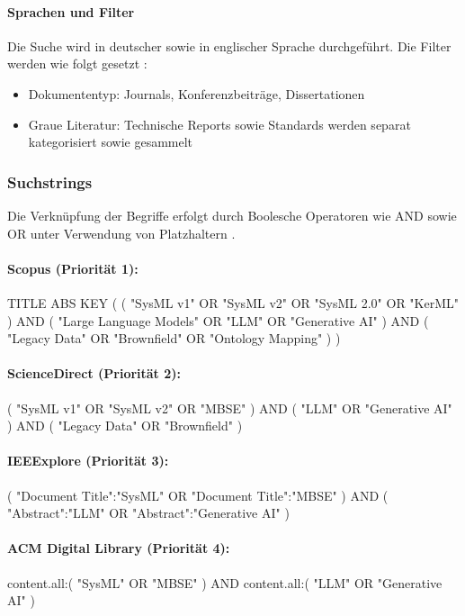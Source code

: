 \paragraph{Sprachen und Filter}

Die Suche wird in deutscher sowie in englischer Sprache durchgeführt. Die Filter werden wie folgt gesetzt \cite{Higgins.2019}:
\begin{itemize}
    \item Dokumententyp: Journals, Konferenzbeiträge, Dissertationen
    \item Graue Literatur: Technische Reports sowie Standards werden separat kategorisiert sowie gesammelt
\end{itemize}

\subsubsection{Suchstrings}
\label{app:lsp_suchstrings}

Die Verknüpfung der Begriffe erfolgt durch Boolesche Operatoren wie AND sowie OR
unter Verwendung von Platzhaltern \cite{Jha.2022}.

\begingroup
{}

\paragraph{Scopus (Priorität 1):}
TITLE ABS KEY ( ( "SysML v1" OR "SysML v2" OR "SysML 2.0" OR "KerML" )
AND ( "Large Language Models" OR "LLM" OR "Generative AI" )
AND ( "Legacy Data" OR "Brownfield" OR "Ontology Mapping" ) )

\paragraph{ScienceDirect (Priorität 2):}
( "SysML v1" OR "SysML v2" OR "MBSE" )
AND ( "LLM" OR "Generative AI" )
AND ( "Legacy Data" OR "Brownfield" )

\paragraph{IEEExplore (Priorität 3):}
( "Document Title":"SysML" OR "Document Title":"MBSE" )
AND ( "Abstract":"LLM" OR "Abstract":"Generative AI" )

\paragraph{ACM Digital Library (Priorität 4):}
content.all:( "SysML" OR "MBSE" )
AND content.all:( "LLM" OR "Generative AI" )

